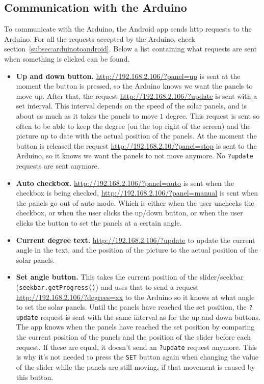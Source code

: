 \documentclass{article}
\begin{document}
    \subsection{Communication with the Arduino}\label{subsec:communicationWithTheArduino}
    To communicate with the Arduino, the Android app sends http requests to the Arduino.
    For all the requests accepted by the Arduino, check section~\ref{subsec:arduinotoandroid}.
    Below a list containing what requests are sent when something is clicked can be found.
    \begin{itemize}
        \item \textbf{Up and down button.} \url{http://192.168.2.106/?panel=up} is sent at the moment the button is pressed, so the Arduino knows we want the panels to move up.
        After that, the request \url{http://192.168.2.106/?update} is sent with a set interval.
        This interval depends on the speed of the solar panels, and is about as much as it takes the panels to move $1$ degree.
        This request is sent so often to be able to keep the degree (on the top right of the screen) and the picture up to date with the actual position of the panels.
        At the moment the button is released the request \url{http://192.168.2.10/?panel=stop} is sent to the Arduino, so it knows we want the panels to not move anymore.
        No \verb|?update| requests are sent anymore.

        \item \textbf{Auto checkbox.} \url{http://192.168.2.106/?panel=auto} is sent when the checkbox is being checked, \url{http://192.168.2.106/?panel=manual} is sent when the panels go out of auto mode.
        Which is either when the user unchecks the checkbox, or when the user clicks the up/down button, or when the user clicks the button to set the panels at a certain angle.

        \item \textbf{Current degree text.} \url{http://192.168.2.106/?update} to update the current angle in the text, and the position of the picture to the actual position of the solar panels.

        \item \textbf{Set angle button.} This takes the current position of the slider/seekbar (\verb|seekbar.getProgress()|) and uses that to send a request \url{http://192.168.2.106/?degrees=xx} to the Arduino so it knows at what angle to set the solar panels.
        Until the panels have reached the set position, the \verb|?update| request is sent with the same interval as for the up and down buttons.
        The app knows when the panels have reached the set position by comparing the current position of the panels and the position of the slider before each request.
        If these are equal, it doesn't send an \verb|?update| request anymore.
        This is why it's not needed to press the \verb|SET| button again when changing the value of the slider while the panels are still moving, if that movement is caused by this button.
    \end{itemize}
\end{document}

